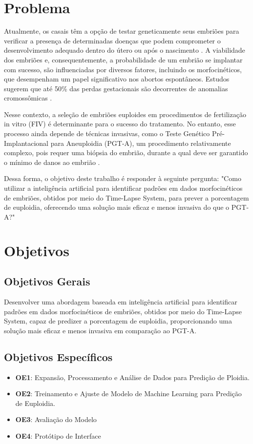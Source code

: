 \section{Problema}

Atualmente, os casais têm a opção de testar geneticamente seus embriões para verificar a presença de determinadas doenças que podem comprometer o desenvolvimento adequado dentro do útero ou após o nascimento \cite{scienceofbiogenetics2024}. A viabilidade dos embriões e, consequentemente, a probabilidade de um embrião se implantar com sucesso, são influenciadas por diversos fatores, incluindo os morfocinéticos, que desempenham um papel significativo nos abortos espontâneos. Estudos sugerem que até 50\% das perdas gestacionais são decorrentes de anomalias cromossômicas \cite{scienceofbiogenetics2024}.

Nesse contexto, a seleção de embriões euploides em procedimentos de fertilização in vitro (FIV) é determinante para o sucesso do tratamento. No entanto, esse processo ainda depende de técnicas invasivas, como o Teste Genético Pré-Implantacional para Aneuploidia (PGT-A), um procedimento relativamente complexo, pois requer uma biópsia do embrião, durante a qual deve ser garantido o mínimo de danos ao embrião \cite{yang2024}.

Dessa forma, o objetivo deste trabalho é responder à seguinte pergunta: "Como utilizar a inteligência artificial para identificar padrões em dados morfocinéticos de embriões, obtidos por meio do Time-Lapse System, para prever a porcentagem de euploidia, oferecendo uma solução mais eficaz e menos invasiva do que o PGT-A?"

\section{Objetivos}

\subsection{Objetivos Gerais}
Desenvolver uma abordagem baseada em inteligência artificial para identificar padrões em dados morfocinéticos de embriões, obtidos por meio do Time-Lapse System, capaz de predizer a porcentagem de euploidia, proporcionando uma solução mais eficaz e menos invasiva em comparação ao PGT-A.

\subsection{Objetivos Específicos}
\begin{itemize}
    \item \textbf{OE1}: Expansão, Processamento e Análise de Dados para Predição de Ploidia.
    \item \textbf{OE2}: Treinamento e Ajuste de Modelo de Machine Learning para Predição de Euploidia.
    \item \textbf{OE3}: Avaliação do Modelo
    \item \textbf{OE4}: Protótipo de Interface
\end{itemize}

